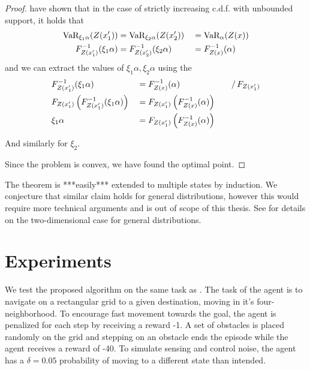 \begin{proof}
\citet{bernard2015quantile} have shown that in the case of strictly increasing c.d.f. with unbounded support, it holds that
\begin{equation}
\begin{split}
\text{VaR}_{\xi_1\alpha}(Z(x_1')) &= \text{VaR}_{\xi_2\alpha}(Z(x_2')) &&= \text{VaR}_\alpha(Z(x))\\
F^{-1}_{Z(x_1')}(\xi_1\alpha) &= F^{-1}_{Z(x_2')}(\xi_2\alpha) &&= F^{-1}_{Z(x)}(\alpha)
\end{split}
\end{equation}
and we can extract the values of $\xi_1\alpha, \xi_2\alpha$ using the 
\begin{equation}
\begin{split}
&F^{-1}_{Z(x_1')}(\xi_1\alpha) &&= F^{-1}_{Z(x)}(\alpha) &&&/ \, F_{Z(x_1')}\\
&F_{Z(x_1')}\left( {F^{-1}_{Z(x_1')}(\xi_1\alpha)} \right) &&= F_{Z(x_1')}\left( {F^{-1}_{Z(x)}(\alpha)} \right)\\
&\xi_1\alpha &&= F_{Z(x_1')}\left( {F^{-1}_{Z(x)}(\alpha)} \right)
\end{split}
\end{equation}

And similarly for $\xi_2$.

Since the problem is convex, we have found the optimal point.

\end{proof}

The theorem is ***easily*** extended to multiple states by induction. We conjecture that similar claim holds for general distributions, however this would require more technical arguments and is out of scope of this thesis. See \citet{bernard2015quantile} for details on the two-dimensional case for general distributions.






\section{Experiments}\label{sec:vi:experiments}

We test the proposed algorithm on the same task as \citet{chow2015risk}. The task of the agent is to navigate on a rectangular grid to a given destination, moving in it's four-neighborhood. To encourage fast movement towards the goal, the agent is penalized for each step by receiving a reward -1. A set of obstacles is placed randomly on the grid and stepping on an obstacle ends the episode while the agent receives a reward of -40.
To simulate sensing and control noise, the agent has a $\delta=0.05$ probability of moving to a different state than intended.

